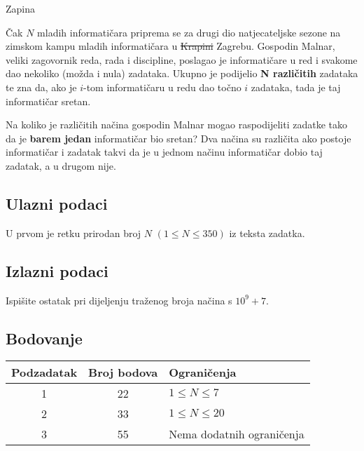 \begin{statement}[
  problempoints=110,
  timelimit=1 sekunda,
  memorylimit=512 MiB,
]{Zapina}

Čak $N$ mladih informatičara priprema se za drugi dio natjecateljske sezone na
zimskom kampu mladih informatičara u \sout{Krapini} Zagrebu. Gospodin Malnar,
veliki zagovornik reda, rada i discipline, poslagao je informatičare u red i
svakome dao nekoliko (možda i nula) zadataka. Ukupno je podijelio \textbf{N
različitih} zadataka te zna da, ako je $i$-tom informatičaru u redu dao točno
$i$ zadataka, tada je taj informatičar sretan.

Na koliko je različitih načina gospodin Malnar mogao raspodijeliti zadatke tako
da je \textbf{barem jedan} informatičar bio sretan? Dva načina su različita
ako postoje informatičar i zadatak takvi da je u jednom načinu informatičar
dobio taj zadatak, a u drugom nije.

\subsection*{Ulazni podaci}
U prvom je retku prirodan broj $N$ $(1 \le N \le 350)$ iz teksta zadatka.

\subsection*{Izlazni podaci}
Ispišite ostatak pri dijeljenju traženog broja načina s $10^9+7$.

 \subsection*{Bodovanje}
{\renewcommand{\arraystretch}{1.4}
  \setlength{\tabcolsep}{6pt}
  \begin{tabular}{ccl}
 Podzadatak & Broj bodova & Ograničenja \\ \midrule
  1 & 22 & $1 \le N \le 7$ \\
  2 & 33 & $1 \le N \le 20$ \\
  3 & 55 & Nema dodatnih ograničenja
\end{tabular}}


\end{statement}
